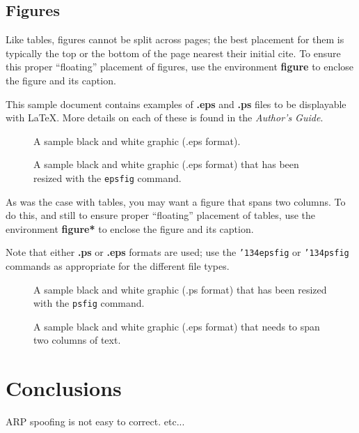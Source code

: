 \documentclass{acm_proc_article-sp}
\begin{document}
\subsection{Figures}
Like tables, figures cannot be split across pages; the
best placement for them
is typically the top or the bottom of the page nearest
their initial cite.  To ensure this proper ``floating'' placement
of figures, use the environment
\textbf{figure} to enclose the figure and its caption.

This sample document contains examples of \textbf{.eps}
and \textbf{.ps} files to be displayable with \LaTeX.  More
details on each of these is found in the \textit{Author's Guide}.

\begin{figure}
\centering
{}
\caption{A sample black and white graphic (.eps format).}
\end{figure}

\begin{figure}
\centering
{}
\caption{A sample black and white graphic (.eps format)
that has been resized with the \texttt{epsfig} command.}
\end{figure}


As was the case with tables, you may want a figure
that spans two columns.  To do this, and still to
ensure proper ``floating'' placement of tables, use the environment
\textbf{figure*} to enclose the figure and its caption.

Note that either {\textbf{.ps}} or {\textbf{.eps}} formats are
used; use
the \texttt{{\char'134}epsfig} or \texttt{{\char'134}psfig}
commands as appropriate for the different file types.

\begin{figure}
\centering
{}
\caption{A sample black and white graphic (.ps format) that has
been resized with the \texttt{psfig} command.}
\end{figure}

\begin{figure*}
\centering
{}
\caption{A sample black and white graphic (.eps format)
that needs to span two columns of text.}
\end{figure*}
 




\section{Conclusions}
ARP spoofing is not easy to correct. etc... 
\end{document}
